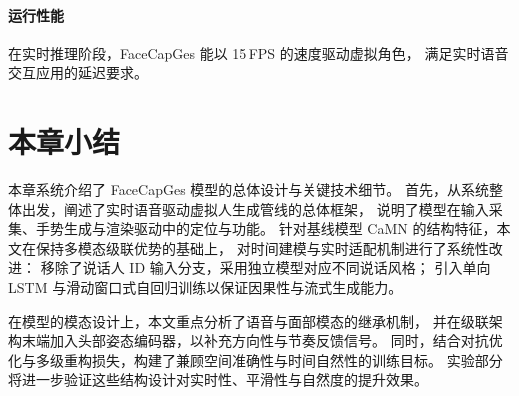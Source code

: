 \paragraph{运行性能}
在实时推理阶段，FaceCapGes 能以 15\,FPS 的速度驱动虚拟角色，
满足实时语音交互应用的延迟要求。

\section{本章小结}
本章系统介绍了 FaceCapGes 模型的总体设计与关键技术细节。  
首先，从系统整体出发，阐述了实时语音驱动虚拟人生成管线的总体框架，  
说明了模型在输入采集、手势生成与渲染驱动中的定位与功能。
针对基线模型 CaMN 的结构特征，本文在保持多模态级联优势的基础上，  
对时间建模与实时适配机制进行了系统性改进：  
移除了说话人 ID 输入分支，采用独立模型对应不同说话风格；  
引入单向 LSTM 与滑动窗口式自回归训练以保证因果性与流式生成能力。  

在模型的模态设计上，本文重点分析了语音与面部模态的继承机制，  
并在级联架构末端加入头部姿态编码器，以补充方向性与节奏反馈信号。  
同时，结合对抗优化与多级重构损失，构建了兼顾空间准确性与时间自然性的训练目标。  
实验部分将进一步验证这些结构设计对实时性、平滑性与自然度的提升效果。  